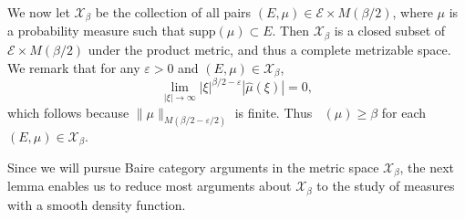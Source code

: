 \documentclass[dvipsnames,letterpaper,12pt]{article}
\numberwithin{equation}{section}
\DeclareMathOperator{\fordim}{\dim_{\mathbf{F}}}
\newtheorem{theorem}{Theorem}
\numberwithin{theorem}{section}
\begin{document}
We now let $\mathcal{X}_\beta$ be the collection of all pairs $(E,\mu) \in \mathcal{E} \times M(\beta/2)$, where $\mu$ is a probability measure such that $\text{supp}(\mu) \subset E$. Then $\mathcal{X}_\beta$ is a closed subset of $\mathcal{E} \times M(\beta/2)$ under the product metric, and thus a complete metrizable space. We remark that for any $\varepsilon > 0$ and $(E,\mu) \in \mathcal{X}_\beta$,
%
\begin{equation} \label{equationGFSCSC4}
    \lim_{|\xi| \to \infty} |\xi|^{\beta/2 - \varepsilon} |\widehat{\mu}(\xi)| = 0,
\end{equation}
%
which follows because $\| \mu \|_{M(\beta/2 - \varepsilon/2)}$ is finite. Thus $\fordim(\mu) \geq \beta$ for each $(E,\mu) \in \mathcal{X}_\beta$.

\begin{comment}
\begin{theorem}
    $\mathcal{X}$ is a closed subset of $\mathcal{E} \times M(\beta)$.
\end{theorem}
\begin{proof}
    Suppose $\{ (E_k,\mu_k) \}$ is a sequence of elements of $\mathcal{X}$ converging to some tuple $(E,\mu) \in \mathcal{E} \times M(\beta)$. Fix $\varepsilon > 0$. Since $E_k \to E$ in the Hausdorff dimension, there exists $k_0$ such that for $k \geq k_0$, $E_k \subset E(\varepsilon)$. Since $\mu_k \to \mu$ weakly, this implies that $\mu$ is a probability measure, and that $\text{supp}(\mu) \subset E(\varepsilon)$. Taking $\varepsilon \to 0$ shows that $\text{supp}(\mu) \subset E$. Again for a fixed $\varepsilon > 0$, applying the triangle inequality and the reverse triangle inequality combined with \eqref{equationGFSCSC4} applied to $\mu_k$, we conclude
    \[ \lim_{|\xi| \to \infty} |\xi|^{\beta/2 - \varepsilon} |\widehat{\mu}(\xi)| = \lim_{|\xi| \to \infty} |\xi|^{\beta/2 - \varepsilon} |\widehat{\mu}(\xi) - \widehat{\mu_k}(\xi)| \leq \| \mu - \mu_k \|_{M(\beta,\varepsilon)}. \]
    Taking $k \to \infty$ shows that
    \[ \lim_{|\xi| \to \infty} |\xi|^{\beta/2 - \varepsilon} |\widehat{\mu}(\xi)| = 0, \]
    which completes the proof.
\end{proof}
\end{comment}

Since we will pursue Baire category arguments in the metric space $\mathcal{X}_\beta$, the next lemma enables us to reduce most arguments about $\mathcal{X}_\beta$ to the study of measures with a smooth density function.
\end{document}
